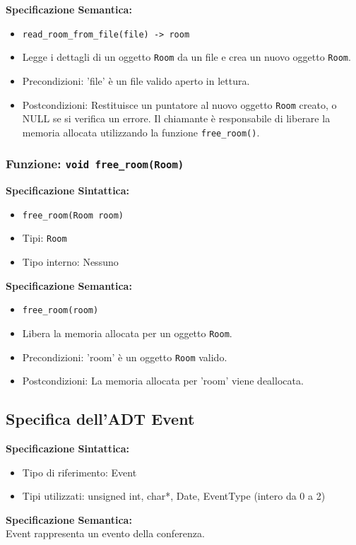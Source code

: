 \documentclass[11pt]{scrartcl} %
\begin{document}
\textbf{Specificazione Semantica:}
\begin{itemize}
	\item \texttt{read\_room\_from\_file(file) -> room}
	\item Legge i dettagli di un oggetto \texttt{Room} da un file e crea un nuovo oggetto \texttt{Room}.
	\item Precondizioni: 'file' è un file valido aperto in lettura.
	\item Postcondizioni: Restituisce un puntatore al nuovo oggetto \texttt{Room} creato, o NULL se si verifica un errore. Il chiamante è responsabile di liberare la memoria allocata utilizzando la funzione \texttt{free\_room()}.
\end{itemize}

\subsubsection{Funzione: \texttt{void free\_room(Room)}}

\textbf{Specificazione Sintattica:}
\begin{itemize}
	\item \texttt{free\_room(Room room)}
	\item Tipi: \texttt{Room}
	\item Tipo interno: Nessuno
\end{itemize}

\textbf{Specificazione Semantica:}
\begin{itemize}
	\item \texttt{free\_room(room)}
	\item Libera la memoria allocata per un oggetto \texttt{Room}.
	\item Precondizioni: 'room' è un oggetto \texttt{Room} valido.
	\item Postcondizioni: La memoria allocata per 'room' viene deallocata.
\end{itemize}

\subsection{Specifica dell'ADT Event}

\textbf{Specificazione Sintattica:}
\begin{itemize}
	\item Tipo di riferimento: Event
	\item Tipi utilizzati: unsigned int, char*, Date, EventType (intero da 0 a 2)
\end{itemize}
\textbf{Specificazione Semantica:} \\
Event rappresenta un evento della conferenza.\\
\end{document}
